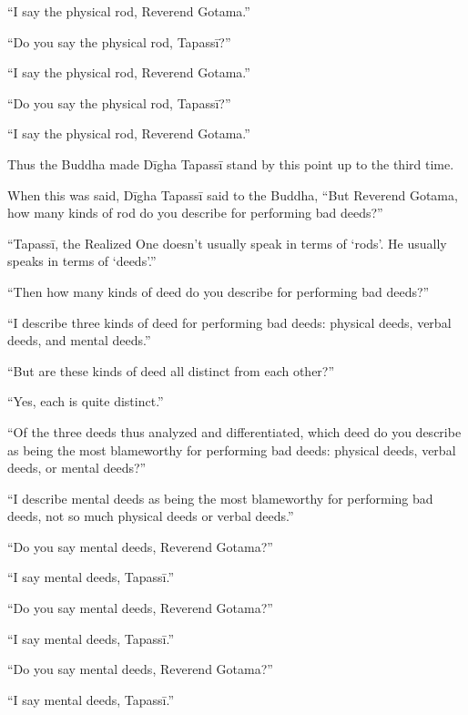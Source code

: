 \documentclass[12pt,openany]{book}%
\begin{document}
“I say the physical rod, Reverend Gotama.” 

“Do you say the physical rod, \textsanskrit{Tapassī}?” 

“I say the physical rod, Reverend Gotama.” 

“Do you say the physical rod, \textsanskrit{Tapassī}?” 

“I say the physical rod, Reverend Gotama.” 

Thus the Buddha made \textsanskrit{Dīgha} \textsanskrit{Tapassī} stand by this point up to the third time. 

When this was said, \textsanskrit{Dīgha} \textsanskrit{Tapassī} said to the Buddha, “But Reverend Gotama, how many kinds of rod do you describe for performing bad deeds?” 

“\textsanskrit{Tapassī}, the Realized One doesn’t usually speak in terms of ‘rods’. He usually speaks in terms of ‘deeds’.” 

“Then how many kinds of deed do you describe for performing bad deeds?” 

“I describe three kinds of deed for performing bad deeds: physical deeds, verbal deeds, and mental deeds.” 

“But are these kinds of deed all distinct from each other?” 

“Yes, each is quite distinct.” 

“Of the three deeds thus analyzed and differentiated, which deed do you describe as being the most blameworthy for performing bad deeds: physical deeds, verbal deeds, or mental deeds?” 

“I describe mental deeds as being the most blameworthy for performing bad deeds, not so much physical deeds or verbal deeds.” 

“Do you say mental deeds, Reverend Gotama?” 

“I say mental deeds, \textsanskrit{Tapassī}.” 

“Do you say mental deeds, Reverend Gotama?” 

“I say mental deeds, \textsanskrit{Tapassī}.” 

“Do you say mental deeds, Reverend Gotama?” 

“I say mental deeds, \textsanskrit{Tapassī}.” 
\end{document}
